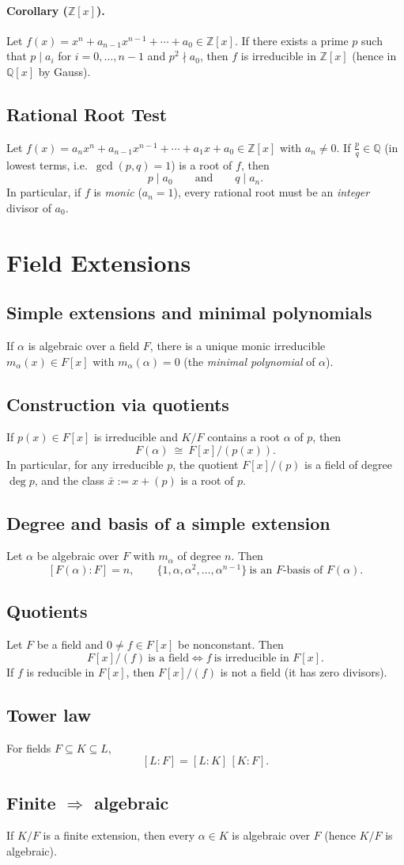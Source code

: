 \documentclass[12pt]{article}
\begin{document}
\paragraph{Corollary ($\mathbb{Z}[x]$).}
Let $f(x)=x^n+a_{n-1}x^{n-1}+\cdots+a_0\in\mathbb{Z}[x]$. 
If there exists a prime $p$ such that $p\mid a_i$ for $i=0,\dots,n-1$ and $p^2\nmid a_0$, 
then $f$ is irreducible in $\mathbb{Z}[x]$ (hence in $\mathbb{Q}[x]$ by Gauss).
\subsection{Rational Root Test}
Let $f(x)=a_nx^n+a_{n-1}x^{n-1}+\cdots+a_1x+a_0\in\mathbb{Z}[x]$ with $a_n\ne0$.
If $\frac{p}{q}\in\mathbb{Q}$ (in lowest terms, i.e.\ $\gcd(p,q)=1$) is a root of $f$, then
\[
p\mid a_0\qquad\text{and}\qquad q\mid a_n.
\]
In particular, if $f$ is \emph{monic} ($a_n=1$), every rational root must be an \emph{integer} divisor of $a_0$.

\section{Field Extensions}
\subsection{Simple extensions and minimal polynomials}
If $\alpha$ is algebraic over a field $F$, there is a unique monic irreducible
$m_\alpha(x)\in F[x]$ with $m_\alpha(\alpha)=0$ (the \emph{minimal polynomial} of $\alpha$).
\subsection{Construction via quotients}
If $p(x)\in F[x]$ is irreducible and $K/F$ contains a root $\alpha$ of $p$, then
\[
F(\alpha)\ \cong\ F[x]/(p(x)).
\]
In particular, for any irreducible $p$, the quotient $F[x]/(p)$ is a field of degree $\deg p$,
and the class $\bar x:=x+(p)$ is a root of $p$.

\subsection{Degree and basis of a simple extension}
Let $\alpha$ be algebraic over $F$ with $m_\alpha$ of degree $n$. Then
\[
[F(\alpha):F]=n,\qquad \{1,\alpha,\alpha^2,\dots,\alpha^{n-1}\}\ \text{is an $F$-basis of }F(\alpha).
\]

\subsection{Quotients}
Let $F$ be a field and $0\neq f\in F[x]$ be nonconstant. Then
\[
F[x]/(f)\ \text{is a field} \iff f \ \text{is irreducible in }F[x].
\]
If $f$ is reducible in $F[x]$, then $F[x]/(f)$ is not a field (it has zero divisors).

\subsection{Tower law}
For fields $F\subseteq K\subseteq L$,
\[
[L:F]=[L:K]\,[K:F].
\]

\subsection{Finite $\Rightarrow$ algebraic}
If $K/F$ is a finite extension, then every $\alpha\in K$ is algebraic over $F$ (hence $K/F$ is algebraic).
\end{document}
